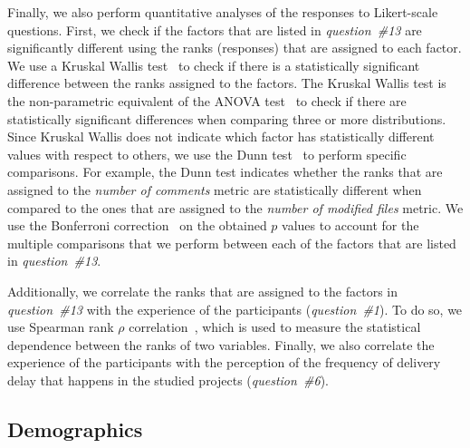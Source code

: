 Finally, we also perform quantitative analyses of the responses to Likert-scale
questions. First, we check if the factors that are listed in {\em question~\#13}
are significantly different using the ranks (responses) that are assigned to
each factor. We use a Kruskal Wallis test~\cite{kruskal1952use} to check if
there is a statistically significant difference between the ranks assigned to
the factors. The Kruskal Wallis test is the non-parametric equivalent of the
ANOVA test~\cite{fisher1925statistical} to check if there are statistically
significant differences when comparing three or more distributions. Since
Kruskal Wallis does not indicate which factor has statistically different values
with respect to others, we use the Dunn test~\cite{dunn1964multiple} to perform
specific comparisons. For example, the Dunn test indicates whether the ranks
that are assigned to the {\em number of comments} metric are statistically
different when compared to the ones that are assigned to the {\em number of
modified files} metric. We use the Bonferroni correction~\cite{dunn1961multiple}
on the obtained $p$ values to account for the multiple comparisons that we
perform between each of the factors that are listed in {\em question~\#13}. 

Additionally, we correlate the ranks that are assigned to the factors in {\em
question~\#13} with the experience of the participants ({\em question~\#1}). To
do so, we use Spearman rank {$\rho$} correlation~\cite{spearman1904proof}, which
is used to measure the statistical dependence between the ranks of two
variables. Finally, we also correlate the experience of the participants with
the perception of the frequency of delivery delay that happens in the studied
projects ({\em question~\#6}).

\subsection{Demographics}\label{subsubsec:exploratory}

